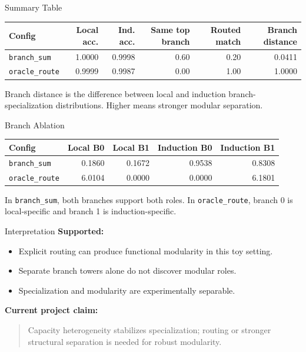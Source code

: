 \documentclass[aspectratio=169]{beamer}
\begin{document}
\begin{frame}{Summary Table}
  \begin{center}
  \scriptsize
  \begin{tabular}{lrrrrr}
    \toprule
    Config & Local acc. & Ind. acc. & Same top branch & Routed match & Branch distance \\
    \midrule
    \texttt{branch\_sum} & 1.0000 & 0.9998 & 0.60 & 0.20 & 0.0411 \\
    \texttt{oracle\_route} & 0.9999 & 0.9987 & 0.00 & 1.00 & 1.0000 \\
    \bottomrule
  \end{tabular}
  \end{center}

  \vspace{0.7em}
  Branch distance is the difference between local and induction branch-specialization
  distributions. Higher means stronger modular separation.
\end{frame}

\begin{frame}{Branch Ablation}
  \begin{center}
  \scriptsize
  \begin{tabular}{lrrrr}
    \toprule
    Config & Local B0 & Local B1 & Induction B0 & Induction B1 \\
    \midrule
    \texttt{branch\_sum} & 0.1860 & 0.1672 & 0.9538 & 0.8308 \\
    \texttt{oracle\_route} & 6.0104 & 0.0000 & 0.0000 & 6.1801 \\
    \bottomrule
  \end{tabular}
  \end{center}

  \vspace{0.7em}
  In \texttt{branch\_sum}, both branches support both roles. In
  \texttt{oracle\_route}, branch 0 is local-specific and branch 1 is
  induction-specific.
\end{frame}

\begin{frame}{Interpretation}
  \textbf{Supported:}
  \begin{itemize}
    \item Explicit routing can produce functional modularity in this toy setting.
    \item Separate branch towers alone do not discover modular roles.
    \item Specialization and modularity are experimentally separable.
  \end{itemize}

  \vspace{0.6em}
  \textbf{Current project claim:}
  \begin{quote}
    Capacity heterogeneity stabilizes specialization; routing or stronger
    structural separation is needed for robust modularity.
  \end{quote}
\end{frame}
\end{document}
